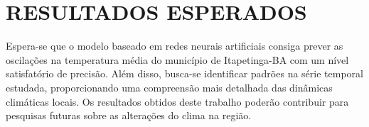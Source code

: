 \chapter{RESULTADOS ESPERADOS}
    Espera-se que o modelo baseado em redes neurais artificiais consiga prever as oscilações na 
    temperatura média do município de Itapetinga-BA com um nível satisfatório de precisão. Além disso, 
    busca-se identificar padrões na série temporal estudada, proporcionando uma compreensão mais detalhada 
    das dinâmicas climáticas locais. Os resultados obtidos deste trabalho poderão contribuir para pesquisas 
    futuras sobre as alterações do clima na região.